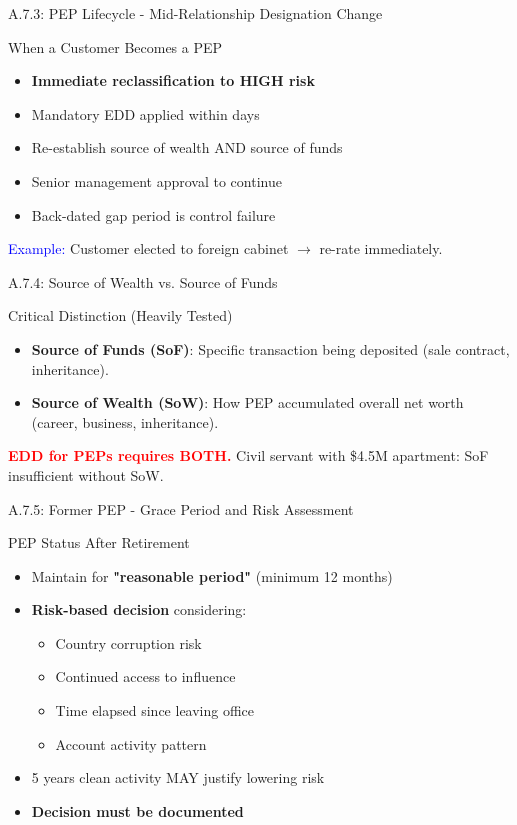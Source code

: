 \documentclass{beamer}
\begin{document}
	\begin{frame}{A.7.3: PEP Lifecycle - Mid-Relationship Designation Change}
		\begin{block}{When a Customer Becomes a PEP}
			\begin{itemize}
				\item \textbf{Immediate reclassification to HIGH risk}
				\item Mandatory EDD applied within days
				\item Re-establish source of wealth AND source of funds
				\item Senior management approval to continue
				\item Back-dated gap period is control failure
			\end{itemize}
		\end{block}
		\textcolor{blue}{Example:} Customer elected to foreign cabinet $\rightarrow$ re-rate immediately.
	\end{frame}
	
	\begin{frame}{A.7.4: Source of Wealth vs. Source of Funds}
		\begin{block}{Critical Distinction (Heavily Tested)}
			\begin{itemize}
				\item \textbf{Source of Funds (SoF)}: Specific transaction being deposited (sale contract, inheritance).
				\item \textbf{Source of Wealth (SoW)}: How PEP accumulated overall net worth (career, business, inheritance).
			\end{itemize}
		\end{block}
		\textcolor{red}{\textbf{EDD for PEPs requires BOTH.}} Civil servant with \$4.5M apartment: SoF insufficient without SoW.
	\end{frame}
	
	\begin{frame}{A.7.5: Former PEP - Grace Period and Risk Assessment}
		\begin{block}{PEP Status After Retirement}
			\begin{itemize}
				\item Maintain for \textbf{"reasonable period"} (minimum 12 months)
				\item \textbf{Risk-based decision} considering:
				\begin{itemize}
					\item Country corruption risk
					\item Continued access to influence
					\item Time elapsed since leaving office
					\item Account activity pattern
				\end{itemize}
				\item 5 years clean activity MAY justify lowering risk
				\item \textbf{Decision must be documented}
			\end{itemize}
		\end{block}
	\end{frame}
	
\end{document}
